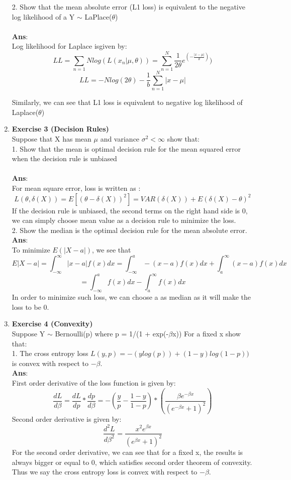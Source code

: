\documentclass{article}
\begin{document}
\begin{enumerate}
2. Show that the mean absolute error (L1 loss) is equivalent to the negative log likelihood of a Y $\sim$ LaPlace($\theta$) \\ \\
\textbf{Ans}: \\
Log likelihood for Laplace isgiven by: 
$$LL=\sum_{n=1}{N}log(L(x_n|\mu,\theta))=\sum_{n=1}^{N}\frac{1}{2\theta}e^(-\frac{|x-\mu|}{\theta}))$$
$$LL=-Nlog(2\theta)-\frac{1}{b}\sum_{n=1}^{N}|x-\mu|$$

Similarly, we can see that L1 loss is equivalent to negative log likelihood of Laplace($\theta$)

\item \textbf{Exercise 3 (Decision Rules)} \\
Suppose that X has mean $\mu$ and variance $\sigma^2 < \infty$ show that: \\

1. Show that the mean is optimal decision rule for the mean squared error when the decision rule is unbiased \\ \\
\textbf{Ans}: \\

For mean square error, loss is written as : $$
L(\theta,\delta(X))=E[(\theta-\delta(X))^2]=VAR(\delta(X))+E(\delta(X)-\theta)^2
$$
If the decision rule is unbiased, the second terms on the right hand side is 0, we can simply choose mean value as a decision rule to minimize the loss. \\

2. Show the median is the optimal decision rule for the mean absolute error. \\
\textbf{Ans}: \\
To minimize $E(|X-a|)$, we see that 
$$E|X-a|=\int_{-\infty}^{\infty}|x-a|f(x)dx = \int_{-\infty}^{a}-(x-a)f(x)dx + \int_{a}^{\infty}(x-a)f(x)dx $$
$$=\int_{-\infty}^{a}f(x)dx -\int_{a}^{\infty}f(x)dx
$$
In order to minimize such loss, we can choose a as median as it will make the loss to be 0. \\


\item \textbf{Exercise 4 (Convexity)} \\ 
Suppose Y $\sim$ Bernoulli(p) where p = 1/(1 + exp(-$\beta$x)) For a fixed x show that:\\ 
1. The cross entropy loss $L(y,p)=-(ylog(p))+(1-y)log(1-p))$ is convex with respect to $−\beta$. \\
\textbf{Ans}: \\
First order derivative of the loss function is given by: 
$$\frac{dL}{d\beta}=\frac{dL}{dp}*\frac{dp}{d\beta}=-(\frac{y}{p}-\frac{1-y}{1-p})*(\frac{\beta e^{-\beta x}} {(e^{-\beta x}+1)^2})$$
Second order derivative is given by: 
$$
\frac{d^2L}{d\beta^2}=\frac{x^2 e^{\beta x}}{(e^{\beta x}+1)^2}
$$
For the second order derivative, we can see that for a fixed x, the results is always bigger or equal to 0, which satisfies second order theorem of convexity. Thus we say the cross entropy loss is convex with respect to $−\beta$.



\end{enumerate}
\end{document}
